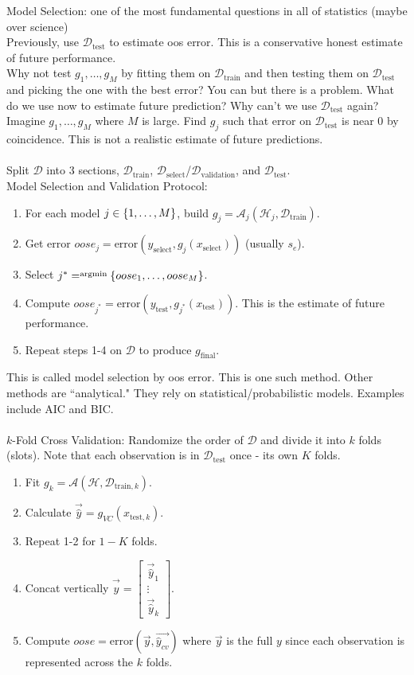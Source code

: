 \documentclass[12pt]{article}
\begin{document}
Model Selection: one of the most fundamental questions in all of statistics (maybe over science) \\
Previously, use $\mathcal{D}_{\text{test}}$ to estimate oos error. This is a conservative honest estimate of future performance. \\
 Why not test $g_1,\dots, g_M$ by fitting them on $\mathcal{D}_{\text{train}}$ and then testing them on $\mathcal{D}_{\text{test}}$ and picking the one with the best error? You can but there is a problem. What do we use now to estimate future prediction? Why can't we use $\mathcal{D}_{\text{test}}$ again? \\
 Imagine $g_1,\dots, g_M$ where $M$ is large. Find $g_j$ such that error on $\mathcal{D}_{\text{test}}$ is near $0$ by coincidence. This is not a realistic estimate of future predictions. \\~\\
 Split $\mathcal{D}$ into 3 sections, $\mathcal{D}_{\text{train}}$, $\mathcal{D}_{\text{select}}$/$\mathcal{D}_{\text{validation}}$, and $\mathcal{D}_{\text{test}}$. \\
 Model Selection and Validation Protocol: \begin{enumerate}
 \item For each model $j \in \left\{ 1,\dots,M \right\}$, build $g_j = \mathcal{A}_j(\mathcal{H}_j, \mathcal{D}_{\text{train}})$. 
 \item Get error $oose_j = \text{error}(y_{\text{select}}, g_j(x_{\text{select}}))$ (usually $s_e$). 
 \item Select $j^* = \stackrel{\text{argmin}}{} \left\{ oose_1, \dots, oose_M \right\}$. 
 \item Compute $oose_{j^*} = \text{error}(y_{\text{test}}, g_{j^*}(x_{\text{test}}))$. This is the estimate of future performance. 
 \item Repeat steps 1-4 on $\mathcal{D}$ to produce $g_{\text{final}}$. \end{enumerate} 
 This is called model selection by oos error. This is one such method. Other methods are ``analytical." They rely on statistical/probabilistic models. Examples include AIC and BIC. \\~\\
$k$-Fold Cross Validation: Randomize the order of $\mathcal{D}$ and divide it into $k$ folds (slots). Note that each observation is in $\mathcal{D}_{\text{test}}$ once - its own $K$ folds. \begin{enumerate} 
\item Fit $g_k = \mathcal{A}(\mathcal{H}, \mathcal{D}_{\text{train}, k})$.
\item Calculate $\vec{\hat{y}} = g_{VC}(x_{\text{test}, k})$. 
\item Repeat 1-2 for $1-K$ folds.
\item Concat vertically $\vec{\hat{y}} = \begin{bmatrix} \vec{\hat{y}}_1 \\ \vdots \\ \vec{\hat{y}}_k \end{bmatrix} $.
\item Compute $oose = \text{error}(\vec{y}, \vec{\hat{y}_{cv}})$ where $\vec{y}$ is the full $y$ since each observation is represented across the $k$ folds. \end{enumerate} 
\end{document}

